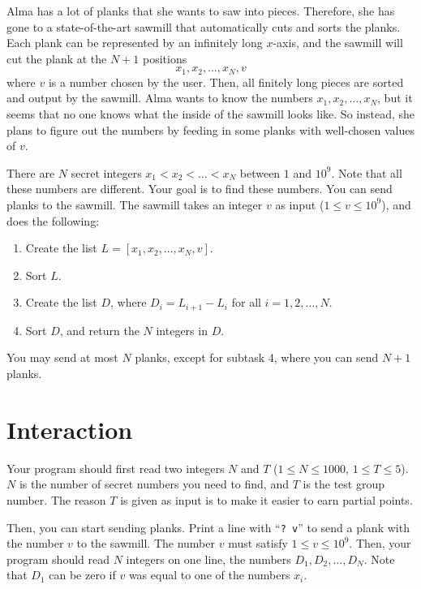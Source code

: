 
Alma has a lot of planks that she wants to saw into pieces. Therefore, she has gone to a state-of-the-art
sawmill that automatically cuts and sorts the planks. Each plank can be represented by an infinitely long
$x$-axis, and the sawmill will cut the plank at the $N+1$ positions $$x_1, x_2, \dots, x_N, v$$
where $v$ is a number chosen by the user. Then, all finitely long pieces are sorted and output by the sawmill.
Alma wants to know the numbers $x_1, x_2, \dots, x_N$, but it seems that no one knows what the inside of the
sawmill looks like. So instead, she plans to figure out the numbers by feeding in some planks with well-chosen values of $v$.

There are $N$ secret integers $x_1 < x_2 < \dots < x_N$ between $1$ and $10^9$. Note that all these numbers
are different. Your goal is to find these numbers. You can send planks to the sawmill. The sawmill takes
an integer $v$ as input ($1 \leq v \leq 10^9$), and does the following:

\begin{enumerate}
  \item Create the list $L = [x_1, x_2, \dots, x_N, v]$.
  \item Sort $L$.
  \item Create the list $D$, where $D_i = L_{i+1}-L_i$ for all $i = 1, 2, \dots, N$.
  \item Sort $D$, and return the $N$ integers in $D$.
\end{enumerate}

You may send at most $N$ planks, except for subtask 4, where you can send $N+1$ planks.

\section*{Interaction}
Your program should first read two integers $N$ and $T$ ($1 \leq N \leq 1000$, $1 \leq T \leq 5$).
$N$ is the number of secret numbers you need to find, and $T$ is the test group number.
The reason $T$ is given as input is to make it easier to earn partial points.

Then, you can start sending planks. Print a line with ``\verb|? v|'' to send a plank with the
number $v$ to the sawmill. The number $v$ must satisfy $1 \leq v \leq 10^9$. Then, your program
should read $N$ integers on one line, the numbers $D_1, D_2, \dots, D_N$. Note that $D_1$ can
be zero if $v$ was equal to one of the numbers $x_i$.

